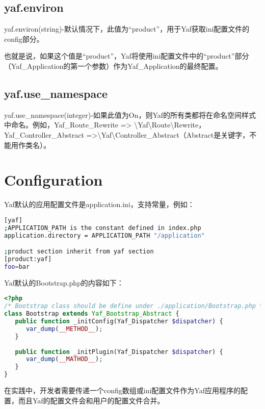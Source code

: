 \subsection{yaf.environ}

yaf.environ(string)-默认情况下，此值为“product”，用于Yaf获取ini配置文件的config部分。

也就是说，如果这个值是“product”，Yaf将使用ini配置文件中的“product”部分（Yaf\_Application的第一个参数）作为Yaf\_Application的最终配置。

\subsection{yaf.use\_namespace}

yaf.use\_namespace(integer)-如果此值为On，则Yaf的所有类都将在命名空间样式中命名。例如，Yaf\_Route\_Rewrite => \textbackslash Yaf\textbackslash Route\textbackslash Rewrite，Yaf\_Controller\_Abstract =>\textbackslash Yaf\textbackslash Controller\_Abstract（Abstract是关键字，不能用作类名）。






\section{Configuration}



Yaf默认的应用配置文件是application.ini，支持常量，例如：

\begin{lstlisting}[language=bash]
[yaf]
;APPLICATION_PATH is the constant defined in index.php
application.directory = APPLICATION_PATH "/application"

;product section inherit from yaf section
[product:yaf]
foo=bar
\end{lstlisting}

Yaf默认的Bootstrap.php的内容如下：

\begin{lstlisting}[language=PHP]
<?php
/* Bootstrap class should be define under ./application/Bootstrap.php */
class Bootstrap extends Yaf_Bootstrap_Abstract {
   public function _initConfig(Yaf_Dispatcher $dispatcher) {
      var_dump(__METHOD__);
   }
   
   public function _initPlugin(Yaf_Dispatcher $dispatcher) {
      var_dump(__MATHOD__);
   }
}
\end{lstlisting}


在实践中，开发者需要传递一个config数组或ini配置文件作为Yaf应用程序的配置，而且Yaf的配置文件会和用户的配置文件合并。

